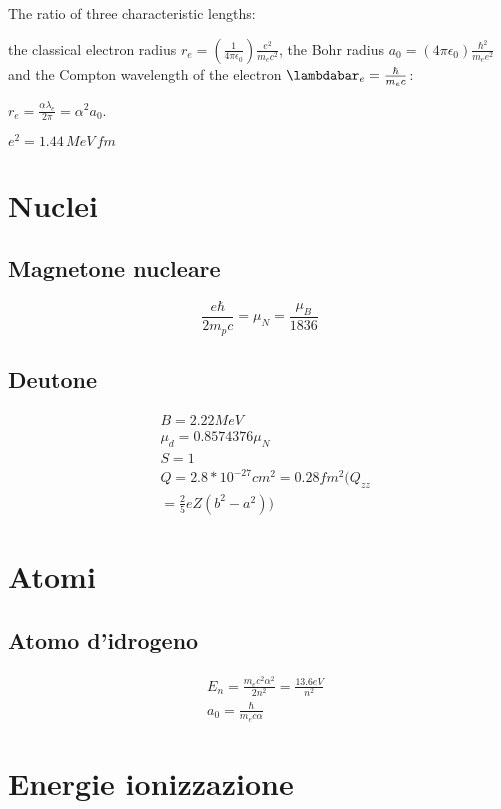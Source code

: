 \documentclass[oneside,12pt,fleqn]{memoir}
\begin{document}
The ratio of three characteristic lengths:

the classical electron radius $r_e=(\frac{1}{4\pi\epsilon_0})\frac{e^2}{m_ec^2}$, the Bohr radius $a_0=(4\pi\epsilon_0)\frac{\hbar^2}{m_ee^2}$  and the Compton wavelength of the electron $\lambdabar_e=\frac{\hbar}{m_ec}$:

$r_e=\frac{\alpha\lambda_e}{2\pi}=\alpha^2a_0$.

$e^2=1.44\,MeV\,fm$


\section{Nuclei}

\subsection{Magnetone nucleare}
 
\begin{equation*}
\frac{e\hbar}{2m_pc}=\mu_N=\frac{\mu_B}{1836}
\end{equation*}
 
\subsection{Deutone}
 
\begin{align*}
&B=2.22 MeV\\
&\mu_d=0.8574376\mu_N\\
&S=1\\
&Q=2.8*10^{-27}cm^2=0.28fm^2(Q_{zz}\\
&=\frac{2}{5}eZ(b^2-a^2))
\end{align*}
 
\section{Atomi}

\subsection{Atomo d'idrogeno}

\begin{align*}
&E_n=\frac{m_ec^2\alpha^2}{2n^2}=\frac{13.6eV}{n^2}\\
&a_0=\frac{\hbar}{m_ec\alpha}
 \end{align*}

\section{Energie ionizzazione}
 
\end{document}
